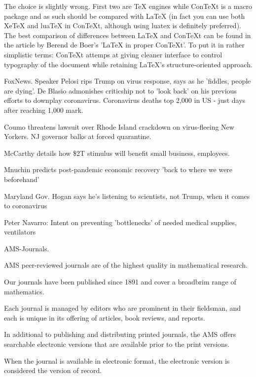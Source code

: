 The choice is slightly wrong. First two are TeX
engines while ConTeXt is a macro package
and as such should be compared with LaTeX
(in fact you can use both XeTeX and luaTeX
in ConTeXt, although using luatex is definitely
preferred). The best comparison of differences
between LaTeX and ConTeXt can be found in the
article by Berend de Boer's 'LaTeX in proper
ConTeXt'. To put it in rather simplistic
terms: ConTeXt attemps at giving cleaner interface
to control typography of the document
while retaining LaTeX's structure-oriented approach.

\smallskip{}

\fi

FoxNews. Speaker Pelosi rips Trump on virus response, says as he 'fiddles, people are dying'.
De Blasio admonishes criticship not to 'look back' on his previous efforts to downplay coronavirus. Coronavirus deaths top 2,000 in US - just days after reaching 1,000 mark.

Coumo threatens lawsuit over Rhode Island crackdown on virus-fleeing New Yorkers. NJ governor balks at forced quarantine.

McCarthy details how \$2T stimulus will benefit small business, employees.

Mnuchin predicts post-pandemic economic recovery 'back to where we were beforehand'

Maryland Gov. Hogan says he's listening to scientists, not Trump, when it comes to coronavirus

Peter Navarro: Intent on preventing 'bottlenecks' of needed medical supplies, ventilators

\smallskip{}

\fi

AMS-Journals.

AMS peer-reviewed journals are of the highest quality in mathematical research.

Our journals have been published since 1891 and cover a broadbrim range of mathematics.

Each journal is managed by editors who are prominent in their fieldsman, and each is unique in its offering of articles, book reviews, and reports.

In additional to publishing and distributing printed journals, the AMS offers searchable electronic versions that are available prior to the print versions.

When the journal is available in electronic format, the electronic version is considered the version of record.

